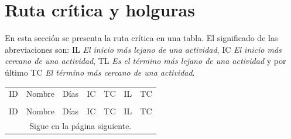 \documentclass[12pt,twoside]{article}
\begin{document}
\section{Ruta crítica y holguras}

En esta sección se presenta la ruta crítica en una tabla. El significado de las abreviaciones
son: IL \textit{El inicio más lejano de una actividad}, IC \textit{El inicio más cercano de una actividad},
TL \textit{Es el término más lejano de una actividad} y por último TC \textit{El término más cercano de una actividad}.

\begin{longtable}{|l|p{5cm}|l|l|l|l|l|}
    \hline
    \rowcolor[HTML]{34CDF9} 
    \multicolumn{7}{|c|}{\cellcolor[HTML]{34CDF9}{\color[HTML]{FFFFFF} Ruta crítica}} \\ \hline
    \rowcolor[HTML]{3166FF} 
    {\color[HTML]{FFFFFF} ID} & {\color[HTML]{FFFFFF} Nombre} & {\color[HTML]{FFFFFF} Días} & {\color[HTML]{FFFFFF} IC} & {\color[HTML]{FFFFFF} TC} & {\color[HTML]{FFFFFF} IL} & {\color[HTML]{FFFFFF} TC} \\ \hline
    \hline
    \endfirsthead
    \hline

    \rowcolor[HTML]{34CDF9} 
    \multicolumn{7}{|c|}{\cellcolor[HTML]{34CDF9}{\color[HTML]{FFFFFF} Ruta crítica}} \\ \hline
    \rowcolor[HTML]{3166FF} 
    {\color[HTML]{FFFFFF} ID} & {\color[HTML]{FFFFFF} Nombre} & {\color[HTML]{FFFFFF} Días} & {\color[HTML]{FFFFFF} IC} & {\color[HTML]{FFFFFF} TC} & {\color[HTML]{FFFFFF} IL} & {\color[HTML]{FFFFFF} TC} \\ \hline
    \hline
    \endhead
    \multicolumn{7}{c}{Sigue en la página siguiente.}
    \endfoot
    \endlastfoot


\end{longtable}
\end{document}

